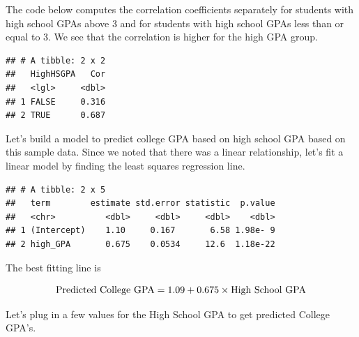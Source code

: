 \documentclass[
]{book}
\newenvironment{Shaded}{\begin{snugshade}}{\end{snugshade}}
\newcommand{\DataTypeTok}[1]{\textcolor[rgb]{0.13,0.29,0.53}{#1}}
\newcommand{\DecValTok}[1]{\textcolor[rgb]{0.00,0.00,0.81}{#1}}
\newcommand{\KeywordTok}[1]{\textcolor[rgb]{0.13,0.29,0.53}{\textbf{#1}}}
\newcommand{\NormalTok}[1]{#1}
\newcommand{\OperatorTok}[1]{\textcolor[rgb]{0.81,0.36,0.00}{\textbf{#1}}}
\newcommand{\StringTok}[1]{\textcolor[rgb]{0.31,0.60,0.02}{#1}}
\begin{document}
The code below computes the correlation coefficients separately for students with high school GPAs above 3 and for students with high school GPAs less than or equal to 3. We see that the correlation is higher for the high GPA group.

\begin{Shaded}
\end{Shaded}

\begin{verbatim}
## # A tibble: 2 x 2
##   HighHSGPA   Cor
##   <lgl>     <dbl>
## 1 FALSE     0.316
## 2 TRUE      0.687
\end{verbatim}

Let's build a model to predict college GPA based on high school GPA based on this sample data. Since we noted that there was a linear relationship, let's fit a linear model by finding the least squares regression line.

\begin{Shaded}
\end{Shaded}

\begin{verbatim}
## # A tibble: 2 x 5
##   term        estimate std.error statistic  p.value
##   <chr>          <dbl>     <dbl>     <dbl>    <dbl>
## 1 (Intercept)    1.10     0.167       6.58 1.98e- 9
## 2 high_GPA       0.675    0.0534     12.6  1.18e-22
\end{verbatim}

The best fitting line is

\[ \hbox{Predicted College GPA} = 1.09 + 0.675 \times \hbox{High School GPA} \]

Let's plug in a few values for the High School GPA to get predicted College GPA's.
\end{document}
